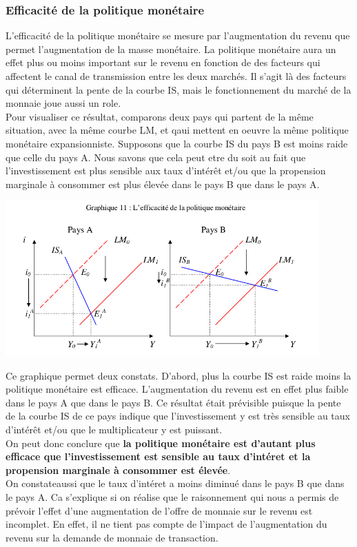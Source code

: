 \documentclass[10pt]{book}
\begin{document}
\subsubsection{Efficacité de la politique monétaire}
L'efficacité de la politique monétaire se mesure par l'augmentation du revenu que permet l'augmentation de la masse monétaire. La politique monétaire aura un effet plus ou moins important sur le revenu en fonction de des facteurs qui affectent le canal de transmission entre les deux marchés. Il s'agit là des facteurs qui déterminent la pente de la courbe IS, mais le fonctionnement du marché de la monnaie joue aussi un role. \\
Pour visualiser ce résultat, comparons deux pays qui partent de la même situation, avec la même courbe LM, et qaui mettent en oeuvre la même politique monétaire expansionniste. Supposons que la courbe IS du pays B est moins raide que celle du pays A. Nous savons que cela peut etre du soit au fait que l'investissement est plus sensible aux taux d'intérêt et/ou que la propension marginale à consommer est plus élevée dans le pays B que dans le pays A.
\begin{center}
  \includegraphics[width=12cm]{graph35.png}
\end{center}
Ce graphique permet deux constats. D'abord, plus la courbe IS est raide moins la politique monétaire est efficace. L'augmentation du revenu est en effet plus faible dans le pays A que dans le pays B. Ce résultat était prévisible puisque la pente de la courbe IS de ce pays indique que l'investissement y est très sensible au taux d'intérêt et/ou que le multiplicateur y est puissant. \\
On peut donc conclure que \textbf{la politique monétaire est d'autant plus efficace que l'investissement est sensible au taux d'intéret et la propension marginale à consommer est élevée}. \\
On constateaussi que le taux d'intéret a moins diminué dans le pays B que dans le pays A. Ca s'explique si on réalise que le raisonnement qui nous a permis de prévoir l'effet d'une augmentation de l'offre de monnaie sur le revenu est incomplet. En effet, il ne tient pas compte de l'impact de l'augmentation du revenu sur la demande de monnaie de transaction. \\
\end{document}
